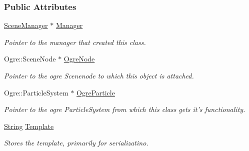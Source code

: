\subsubsection*{Public Attributes}
\begin{DoxyCompactItemize}
\item 
\hypertarget{structMezzanine_1_1internal_1_1ParticleEffectInternalData_ab27dcc612ec9da3cc4e8fdccc5b94be9}{
\hyperlink{classMezzanine_1_1SceneManager}{SceneManager} $\ast$ \hyperlink{structMezzanine_1_1internal_1_1ParticleEffectInternalData_ab27dcc612ec9da3cc4e8fdccc5b94be9}{Manager}}
\label{structMezzanine_1_1internal_1_1ParticleEffectInternalData_ab27dcc612ec9da3cc4e8fdccc5b94be9}

\begin{DoxyCompactList}\small\item\em Pointer to the manager that created this class. \item\end{DoxyCompactList}\item 
\hypertarget{structMezzanine_1_1internal_1_1ParticleEffectInternalData_ae3b7204ec581843fccb53fd66d0bea2c}{
Ogre::SceneNode $\ast$ \hyperlink{structMezzanine_1_1internal_1_1ParticleEffectInternalData_ae3b7204ec581843fccb53fd66d0bea2c}{OgreNode}}
\label{structMezzanine_1_1internal_1_1ParticleEffectInternalData_ae3b7204ec581843fccb53fd66d0bea2c}

\begin{DoxyCompactList}\small\item\em Pointer to the ogre Scenenode to which this object is attached. \item\end{DoxyCompactList}\item 
\hypertarget{structMezzanine_1_1internal_1_1ParticleEffectInternalData_abb9b3976faf30a1137c0470cd1b43918}{
Ogre::ParticleSystem $\ast$ \hyperlink{structMezzanine_1_1internal_1_1ParticleEffectInternalData_abb9b3976faf30a1137c0470cd1b43918}{OgreParticle}}
\label{structMezzanine_1_1internal_1_1ParticleEffectInternalData_abb9b3976faf30a1137c0470cd1b43918}

\begin{DoxyCompactList}\small\item\em Pointer to the ogre ParticleSystem from which this class gets it's functionality. \item\end{DoxyCompactList}\item 
\hypertarget{structMezzanine_1_1internal_1_1ParticleEffectInternalData_af82532832d2413187a60cca4d20c63de}{
\hyperlink{namespaceMezzanine_acf9fcc130e6ebf08e3d8491aebcf1c86}{String} \hyperlink{structMezzanine_1_1internal_1_1ParticleEffectInternalData_af82532832d2413187a60cca4d20c63de}{Template}}
\label{structMezzanine_1_1internal_1_1ParticleEffectInternalData_af82532832d2413187a60cca4d20c63de}

\begin{DoxyCompactList}\small\item\em Stores the template, primarily for serializatino. \item\end{DoxyCompactList}\end{DoxyCompactItemize}


